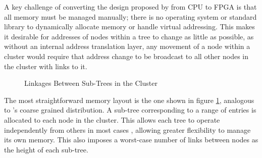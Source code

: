 A key challenge of converting the design proposed by \citeauthor{base} from CPU to FPGA is that all memory must be managed manually; there is no operating system or standard library to dynamically allocate memory or handle virtual addressing. This makes it desirable for addresses of nodes within a tree to change as little as possible, as without an internal address translation layer, any movement of a node within a cluster would require that address change to be broadcast to all other nodes in the cluster with links to it.

\newcommand{\clusternode}[1]{
	\draw ({(#1)*6}, 0) ++(-2.75, 0.5) rectangle ++(5.5, -3);
	\node[tree] at ({(#1)*6}, 0) (n#1 00) {};
	\foreach \r [
		evaluate = \r as \w using int(3^\r),
		evaluate = \r as \wl using int(3^\r-1)
	] in {1,...,2} {
		\foreach \c [
			evaluate = \c as \i using int((\w-1)/2 + \c-1),
			evaluate = \c as \pr using int(\r-1),
			evaluate = \c as \pc using int(\c/3),
			evaluate = \c as \cl using int(\c-1)
		] in {0,...,\wl} {
			\node[tree] (n#1 \r\c)
				at ({(#1)*6 + (\c-int(\w/2)) / (\w/5)}, -\r) {};
			\draw[->] (n#1 \pr\pc) -- (n#1 \r\c);
			\ifthenelse{\c=0}{}{
				\draw[->] (n#1 \r\cl) -- (n#1 \r\c);
			}
		}
	}
}

\begin{figure}
	\centering
	\caption{Linkages Between Sub-Trees in the Cluster}
\label{coarse-link}
\end{figure}

The most straightforward memory layout is the one shown in figure \ref{coarse-link}, analogous to \citeauthor{base}'s coarse grained distribution. A sub-tree corresponding to a range of entries is allocated to each node in the cluster. This allows each tree to operate independently from others in most cases \cite{ma-tpds-2022}, allowing greater flexibility to manage its own memory. This also imposes a worst-case number of links between nodes as the height of each sub-tree.
